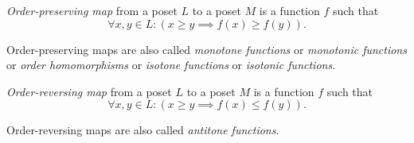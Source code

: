 \documentclass[12pt]{article}
\begin{document}
\emph{Order-preserving map} from a poset $L$ to a poset $M$ is a function $f$ such that
$$\forall x,y\in L:(x\ge y\implies f(x)\ge f(y)).$$

Order-preserving maps are also called \emph{monotone functions} or \emph{monotonic functions} or \emph{order homomorphisms} or \emph{isotone functions} or \emph{isotonic functions}.

\emph{Order-reversing map} from a poset $L$ to a poset $M$ is a function $f$ such that
$$\forall x,y\in L:(x\ge y\implies f(x)\le f(y)).$$

Order-reversing maps are also called \emph{antitone functions}.
\end{document}
